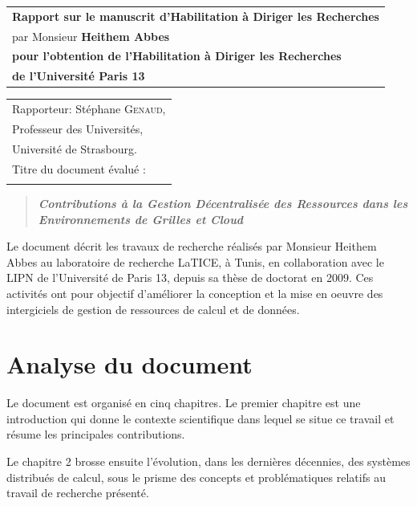 \documentclass[a4paper,12pt]{article}
\begin{document}
\begin{flushleft}
\begin{tabular}[t]{l}
\Large\textsf{\textbf{Rapport sur le manuscrit d'Habilitation à Diriger les Recherches}}\\[4mm]
\Large\textsf{par Monsieur \textbf{Heithem Abbes}}\\[4mm]
\large\textsf{\textbf{pour l'obtention de l'Habilitation à Diriger les Recherches}}\\
\large\textsf{\textbf{de l'Université Paris 13}}\\
\end{tabular}%

\vspace{4mm}

\noindent%
\begin{tabular}[t]{l}
Rapporteur: Stéphane \textsc{Genaud},\\
Professeur des Universités,\\
Université de Strasbourg.\\[5mm]
Titre du document évalué :\\\\[3mm]
\end{tabular}%

\begin{quote}
\Large \textit{\textsf{\textbf{
	  Contributions à la Gestion Décentralisée des Ressources dans les Environnements de Grilles et Cloud
}}}
\end{quote}

\end{flushleft}

\vspace{3mm} Le document  décrit les travaux de recherche  réalisés par Monsieur
Heithem Abbes au laboratoire de recherche LaTICE, à Tunis, en collaboration avec
le LIPN de  l'Université de Paris 13,  depuis sa thèse de doctorat  en 2009. Ces
activités ont pour  objectif d'améliorer la conception et la  mise en oeuvre des
intergiciels de gestion de ressources de calcul et de données.

\section*{Analyse du document}
\label{sec-1}
Le  document  est organisé  en  cinq  chapitres.  Le  premier chapitre  est  une
introduction qui donne le contexte scientifique  dans lequel se situe ce travail
et résume les principales contributions.

Le  chapitre 2  brosse ensuite  l'évolution, dans  les dernières  décennies, des
systèmes distribués  de calcul,  sous le prisme  des concepts  et problématiques
relatifs au travail de recherche présenté.
\end{document}
